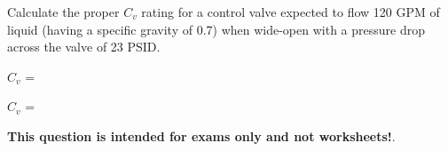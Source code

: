 

Calculate the proper $C_v$ rating for a control valve expected to flow 120 GPM of liquid (having a specific gravity of 0.7) when wide-open with a pressure drop across the valve of 23 PSID.

\vskip 10pt

$C_v$ = \underbar{\hskip 50pt}







$C_v$ = 







{\bf This question is intended for exams only and not worksheets!}.



